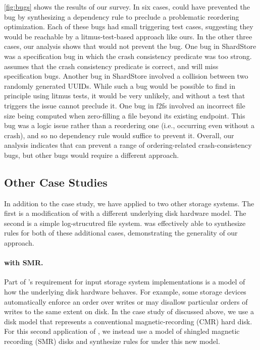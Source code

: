 \cref{fig:bugs} shows the results of our survey.
In six cases, \depsynth could have prevented the bug
by synthesizing a dependency rule to preclude a problematic reordering optimization.
Each of these bugs had small triggering test cases,
suggesting they would be reachable by a litmus-test-based approach like ours.
In the other three cases, our analysis shows that \depsynth would not prevent the bug.
One bug in ShardStore was a specification bug
in which the crash consistency predicate was too strong.
\depsynth assumes that the crash consistency predicate is correct,
and will miss specification bugs.
Another bug in ShardStore involved a collision between two randomly generated UUIDs.
While such a bug would be possible to find in principle using litmus tests,
it would be very unlikely,
and without a test that triggers the issue \depsynth cannot preclude it.
One bug in f2fs involved an incorrect file size being computed when zero-filling a file
beyond its existing endpoint.
This bug was a logic issue rather than a reordering one (i.e., occurring even without a crash),
and so no dependency rule would suffice to prevent it.
Overall, our analysis indicates
that \depsynth can prevent a range of ordering-related crash-consistency bugs,
but other bugs would require a different approach.

\subsection{Other Case Studies}\label{sec:eval:other}

In addition to the \shardstore case study, %
we have applied \depsynth to two other storage systems.
The first is a modification of \shardstore with a different underlying disk hardware model.
The second is a simple log-strucutred file system.
\depsynth was effectively able to synthesize rules for both of these
additional cases, demonstrating the generality of our approach.

\paragraph{\shardstore with SMR.}
Part of \depsynth's requirement for input storage system implementations 
is a model of how the underlying disk hardware behaves.
For example, some storage devices automatically enforce
an order over writes or may disallow particular orders of writes
to the same extent on disk.
In the case study of \shardstore discussed above,
we use a disk model that represents a conventional magnetic-recording (CMR) hard disk.
For this second application of \depsynth, we instead use a model of
shingled magnetic recording (SMR) disks and synthesize rules
for \shardstore under this new model.

